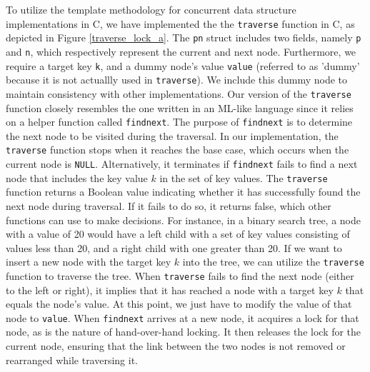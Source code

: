 \documentclass[a4paper,UKenglish,cleveref, autoref, thm-restate]{lipics-v2021}
\begin{document}
To utilize the template methodology for concurrent data structure implementations in C, we have implemented the the \lstinline{traverse} function in C, as depicted in Figure \ref{traverse_lock_a}. The \lstinline{pn} struct includes two fields, namely \lstinline{p} and \lstinline{n}, which respectively represent the current and next node. Furthermore, we require a target key \lstinline{k}, and a dummy node's value \lstinline{value} (referred to as 'dummy' because it is not actuallly used in \lstinline{traverse}). We include this dummy node to maintain consistency with other implementations. Our version of the \lstinline{traverse} function closely resembles the one written in an ML-like language since it relies on a helper function called \lstinline{findnext}. The purpose of \lstinline{findnext} is to determine the next node to be visited during the traversal. In our implementation, the \lstinline{traverse} function stops when it reaches the base case, which occurs when the current node is \lstinline{NULL}. Alternatively, it terminates if \lstinline{findnext} fails to find a next node that includes the key value $k$ in the set of key values. The \lstinline{traverse} function returns a Boolean value indicating whether it has successfully found the next node during traversal. If it fails to do so, it returns false, which other functions can use to make decisions. For instance, in a binary search tree, a node with a value of 20 would have a left child with a set of key values consisting of values less than 20, and a right child with one greater than 20. If we want to insert a new node with the target key $k$ into the tree, we can utilize the \lstinline{traverse} function to traverse the tree. When \lstinline{traverse} fails to find the next node (either to the left or right), it implies that it has reached a node with a target key $k$ that equals the node's value. At this point, we just have to modify the value of that node to \lstinline{value}. When \lstinline{findnext} arrives at a new node, it acquires a lock for that node, as is the nature of hand-over-hand locking. It then releases the lock for the current node, ensuring that the link between the two nodes is not removed or rearranged while traversing it.
\end{document}
